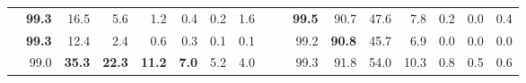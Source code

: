 \begin{table}[htbp!]
\begin{small}
{\begin{tabular}{@{}rrrrrrrrc|crrrrrrr@{}}
 			\PriorNet &  \textbf{99.3} &  16.5 &   5.6 &   1.2 &  0.4 &  0.2 &   1.6 & &
 			          &  \textbf{99.5} &  90.7 &  47.6 &   7.8 &  0.2 &  0.0 &  0.4 \\
 		    \DDNet    &  \textbf{99.3} &  12.4 &   2.4 &   0.6 &  0.3 &  0.1 &   0.1 & &
 		              &  99.2 &  \textbf{90.8} &  45.7 &   6.9 &  0.0 &  0.0 &  0.0 \\
 		    \EvNet    &  99.0 &  \textbf{35.3} &  \textbf{22.3} &  \textbf{11.2} &  \textbf{7.0} &  5.2 &   4.0 & &
 		              &  99.3 &  91.8 &  54.0 &  10.3 &  0.8 &  0.5 &  0.6 \\
 			\bottomrule
 		\end{tabular}
		}
 	\end{small}
 	\label{tab:acc_label_attack}
\end{table}



